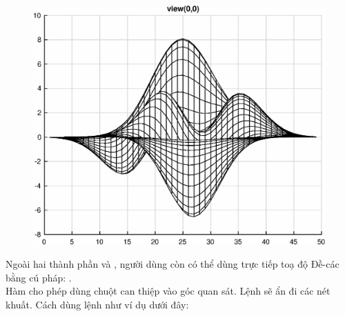 \documentclass[12pt,a4paper]{article}
\begin{document}
\begin{center}
	\begin{figure}[H]
	\begin{center}
		\includegraphics[scale=0.6]{hinhtieuluan/dothi20}
	\end{center}
		\caption{}
		\label{refdothi20}
	\end{figure}
\end{center}
Ngoài hai thành phần  và , người dùng còn có thể dùng trực tiếp toạ độ Đề-các bằng cú pháp: .\\
Hàm  cho phép dùng chuột can thiệp vào góc quan sát. Lệnh  sẽ ẩn đi các nét khuất. Cách dùng lệnh  như ví dụ dưới đây:
\end{document}
